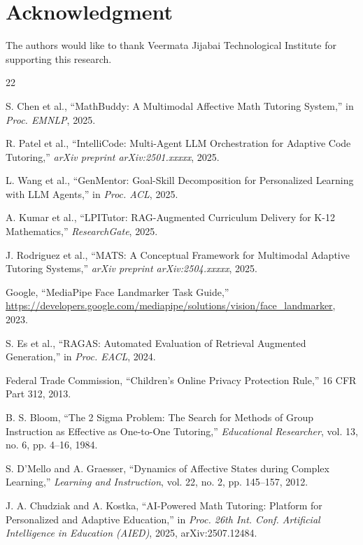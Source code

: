 \documentclass[conference, letterpaper]{IEEEtran}
\begin{document}
\section*{Acknowledgment}

The authors would like to thank Veermata Jijabai Technological Institute for supporting this research.

\begin{thebibliography}{22}

S. Chen et al., ``MathBuddy: A Multimodal Affective Math Tutoring System,'' in \emph{Proc. EMNLP}, 2025.

R. Patel et al., ``IntelliCode: Multi-Agent LLM Orchestration for Adaptive Code Tutoring,'' \emph{arXiv preprint arXiv:2501.xxxxx}, 2025.

L. Wang et al., ``GenMentor: Goal-Skill Decomposition for Personalized Learning with LLM Agents,'' in \emph{Proc. ACL}, 2025.

A. Kumar et al., ``LPITutor: RAG-Augmented Curriculum Delivery for K-12 Mathematics,'' \emph{ResearchGate}, 2025.

J. Rodriguez et al., ``MATS: A Conceptual Framework for Multimodal Adaptive Tutoring Systems,'' \emph{arXiv preprint arXiv:2504.xxxxx}, 2025.

Google, ``MediaPipe Face Landmarker Task Guide,'' \url{https://developers.google.com/mediapipe/solutions/vision/face_landmarker}, 2023.

S. Es et al., ``RAGAS: Automated Evaluation of Retrieval Augmented Generation,'' in \emph{Proc. EACL}, 2024.

Federal Trade Commission, ``Children's Online Privacy Protection Rule,'' 16 CFR Part 312, 2013.

B. S. Bloom, ``The 2 Sigma Problem: The Search for Methods of Group Instruction as Effective as One-to-One Tutoring,'' \emph{Educational Researcher}, vol. 13, no. 6, pp. 4--16, 1984.

S. D'Mello and A. Graesser, ``Dynamics of Affective States during Complex Learning,'' \emph{Learning and Instruction}, vol. 22, no. 2, pp. 145--157, 2012.

J. A. Chudziak and A. Kostka, ``AI-Powered Math Tutoring: Platform for Personalized and Adaptive Education,'' in \emph{Proc. 26th Int. Conf. Artificial Intelligence in Education (AIED)}, 2025, arXiv:2507.12484.


\end{thebibliography}
\end{document}

